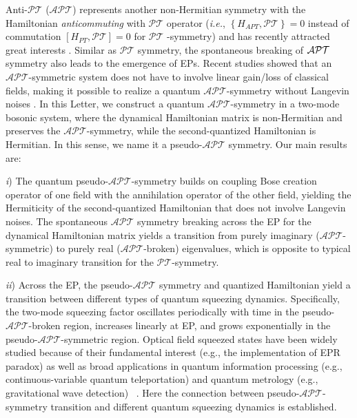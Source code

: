\documentclass[twocolumn,prl,floatfix,citeautoscript,nofootinbib,superscriptaddress]{revtex4}
\begin{document}
Anti-$\mathcal{PT}$ ($\mathcal{APT}$) represents another non-Hermitian
symmetry with the Hamiltonian \textit{anticommuting} with $\mathcal{PT}$
operator (\textit{i.e.}, $\left\{ H_{APT},\mathcal{PT}\right\} =0$ instead
of commutation $\left[ H_{PT},\mathcal{PT}\right] =0$ for $\mathcal{PT}$%
-symmetry) and has recently attracted great interests \cite%
{PhysRevA.88.053810,nphys3842,PhysRevLett.113.123004,PhysRevA.96.053845,PhysRevLett.120.123902,PhysRevX.8.021066,science.aaw6259,PhysRevLett.123.193604,PhysRevA.99.063834,NJP.18}%
. Similar as $\mathcal{PT}$ symmetry, the spontaneous breaking of $\mathcal{%
APT}$ symmetry also leads to the emergence of EPs. Recent studies showed
that an $\mathcal{APT}$-symmetric system does not have to involve linear
gain/loss of classical fields, making it possible to realize a quantum $%
\mathcal{APT}$-symmetry without Langevin noises \cite%
{PhysRevLett.123.193604, NJP.18,PhysRevA.99.063834}. In this Letter, we
construct a quantum $\mathcal{APT}$-symmetry in a two-mode bosonic system,
where the dynamical Hamiltonian matrix is non-Hermitian and preserves the $%
\mathcal{APT}$-symmetry, while the second-quantized Hamiltonian is
Hermitian. In this sense, we name it a pseudo-$\mathcal{APT}$ symmetry. Our
main results are:

\textit{i}) The quantum pseudo-$\mathcal{APT}$-symmetry builds on coupling
Bose creation operator of one field with the annihilation operator of the
other field, yielding the Hermiticity of the second-quantized Hamiltonian
that does not involve Langevin noises. The spontaneous $\mathcal{APT}$
symmetry breaking across the EP for the dynamical Hamiltonian matrix yields
a transition from purely imaginary ($\mathcal{APT}$-symmetric) to purely
real ($\mathcal{APT}$-broken) eigenvalues, which is opposite to typical real
to imaginary transition for the $\mathcal{PT}$-symmetry.

\textit{ii}) Across the EP, the pseudo-$\mathcal{APT}$ symmetry and
quantized Hamiltonian yield a transition between different types of quantum
squeezing dynamics. Specifically, the two-mode squeezing factor oscillates
periodically with time in the pseudo-$\mathcal{APT}$-broken region,
increases linearly at EP, and grows exponentially in the pseudo-$\mathcal{APT%
}$-symmetric region. Optical field squeezed states have been widely studied
because of their fundamental interest (e.g., the implementation of EPR
paradox) as well as broad applications in quantum information processing
(e.g., continuous-variable quantum teleportation) and quantum metrology
(e.g., gravitational wave detection)~\cite{RevModPhys.77.513, Squeezed.light}%
. Here the connection between pseudo-$\mathcal{APT}$-symmetry transition and
different quantum squeezing dynamics is established.
\end{document}

